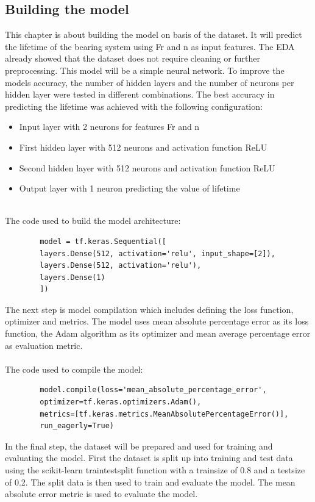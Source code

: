 \documentclass[letterpaper,10pt]{article}
\begin{document}
	\subsection{Building the model}
	This chapter is about building the model on basis of the dataset. It will predict the lifetime of the bearing system using Fr and n as input features. The EDA already showed that the dataset does not require cleaning or further preprocessing.
	\newline This model will be a simple neural network. To improve the models accuracy, the number of hidden layers and the number of neurons per hidden layer were tested in different combinations. The best accuracy in predicting the lifetime was achieved with the following configuration: 
	\begin{itemize}
		\item Input layer with 2 neurons for features Fr and n
		\item First hidden layer with 512 neurons and activation function ReLU
		\item Second hidden layer with 512 neurons and activation function ReLU
		\item Output layer with 1 neuron predicting the value of lifetime
	\end{itemize} 
	\ \\The code used to build the model architecture:
	\begin{lstlisting}
		model = tf.keras.Sequential([
		layers.Dense(512, activation='relu', input_shape=[2]), 
		layers.Dense(512, activation='relu'),  
		layers.Dense(1)
		])
	\end{lstlisting}
	The next step is model compilation which includes defining the loss function, optimizer and metrics. The model uses mean absolute percentage error as its loss function, the Adam algorithm as its optimizer and mean average percentage error as evaluation metric. 
	\\ \\ The code used to compile the model:
	\begin{lstlisting}
		model.compile(loss='mean_absolute_percentage_error',
		optimizer=tf.keras.optimizers.Adam(),
		metrics=[tf.keras.metrics.MeanAbsolutePercentageError()],
		run_eagerly=True)
	\end{lstlisting}
	In the final step, the dataset will be prepared and used for training and evaluating the model. First the dataset is split up into training and test data using the scikit-learn train\textunderscore test\textunderscore split function with a train\textunderscore size of 0.8 and a test\textunderscore size of 0.2. The split data is then used to train and evaluate the model. The mean absolute error metric is used to evaluate the model.
\end{document}
